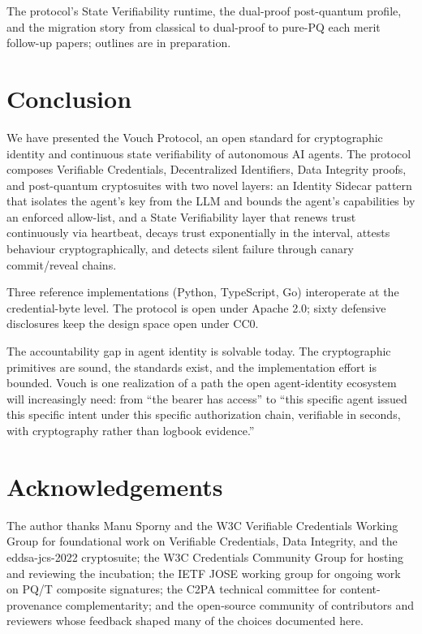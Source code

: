 \documentclass[11pt,a4paper,twocolumn]{article}
\begin{document}
The protocol's State Verifiability runtime, the dual-proof post-quantum profile, and the migration story from classical to dual-proof to pure-PQ each merit follow-up papers; outlines are in preparation.

\section{Conclusion}
\label{sec:conclusion}

We have presented the Vouch Protocol, an open standard for cryptographic identity and continuous state verifiability of autonomous AI agents. The protocol composes Verifiable Credentials, Decentralized Identifiers, Data Integrity proofs, and post-quantum cryptosuites with two novel layers: an Identity Sidecar pattern that isolates the agent's key from the LLM and bounds the agent's capabilities by an enforced allow-list, and a State Verifiability layer that renews trust continuously via heartbeat, decays trust exponentially in the interval, attests behaviour cryptographically, and detects silent failure through canary commit/reveal chains.

Three reference implementations (Python, TypeScript, Go) interoperate at the credential-byte level. The protocol is open under Apache 2.0; sixty defensive disclosures keep the design space open under CC0.

The accountability gap in agent identity is solvable today. The cryptographic primitives are sound, the standards exist, and the implementation effort is bounded. Vouch is one realization of a path the open agent-identity ecosystem will increasingly need: from ``the bearer has access'' to ``this specific agent issued this specific intent under this specific authorization chain, verifiable in seconds, with cryptography rather than logbook evidence.''

\section*{Acknowledgements}

The author thanks Manu Sporny and the W3C Verifiable Credentials Working Group for foundational work on Verifiable Credentials, Data Integrity, and the eddsa-jcs-2022 cryptosuite; the W3C Credentials Community Group for hosting and reviewing the incubation; the IETF JOSE working group for ongoing work on PQ/T composite signatures; the C2PA technical committee for content-provenance complementarity; and the open-source community of contributors and reviewers whose feedback shaped many of the choices documented here.
\end{document}
